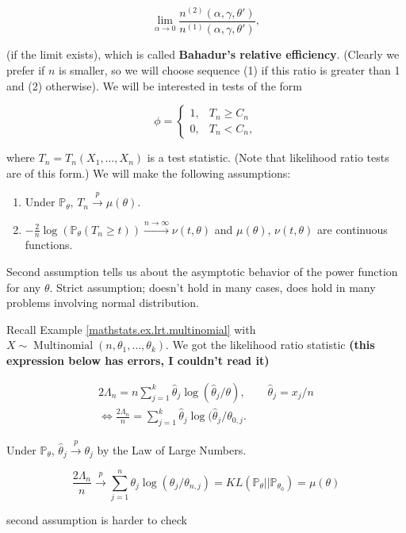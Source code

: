 \[
\lim_{\alpha \to 0} \frac{n^{(2)}(\alpha, \gamma, \theta')}{n^{(1)}(\alpha, \gamma, \theta')},
\]

(if the limit exists), which is called \textbf{Bahadur's relative efficiency}. (Clearly we prefer if \(n\) is smaller, so we will choose sequence (1) if this ratio is greater than 1 and (2) otherwise). We will be interested in tests of the form

\[
\phi = \begin{cases}
1, & T_n \geq C_n \\
0, & T_n < C_n,
\end{cases}
\]

where \(T_n = T_n(X_1, \ldots, X_n)\) is a test statistic. (Note that likelihood ratio tests are of this form.) We will make the following assumptions:

\begin{enumerate}

\item Under \(\mathbb{P}_\theta\), \(T_n \xrightarrow{p} \mu(\theta)\). 

\item \(- \frac{2}{n} \log( \mathbb{P}_\theta(T_n \geq t)) \xrightarrow{n \to \infty} \nu(t, \theta) \) and \(\mu(\theta)\), \(\nu(t, \theta)\) are continuous functions.  

\end{enumerate}

Second assumption tells us about the asymptotic behavior of the power function for any \(\theta\). Strict assumption; doesn't hold in many cases, does hold in many problems involving normal distribution. 

\begin{example}

Recall Example \ref{mathstats.ex.lrt.multinomial} with \(X \sim \operatorname{Multinomial}(n, \theta_1, \ldots, \theta_k)\). We got the likelihood ratio statistic \textbf{(this expression below has errors, I couldn't read it)}

\begin{multline*}
2 \Lambda_n = n \sum_{j=1}^k \hat{\theta}_j \log ( \hat{\theta}_j/ \theta), \qquad \hat{\theta}_j = x_j/n
\\ \iff \frac{2 \Lambda_n}{n} = \sum_{j=1}^k \hat{\theta}_j \log(\hat{\theta}_j/\theta_{0,j}.
\end{multline*}

Under \(\mathbb{P}_\theta\), \(\hat{\theta}_j \xrightarrow{p} \theta_j\) by the Law of Large Numbers. 

\[
\frac{2 \Lambda_n}{n} \xrightarrow{p} \sum_{j=1}^n \theta_j \log(\theta_j/\theta_{n,j}) = KL(\mathbb{P}_\theta || \mathbb{P}_{\theta_0}) = \mu(\theta)
\]

second assumption is harder to check

\end{example}

